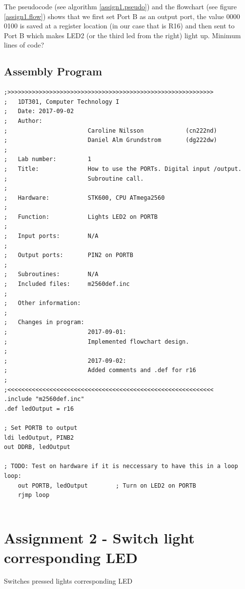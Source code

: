\documentclass[a4paper, 12pt]{article}
\begin{document}
The pseudocode (see algorithm \ref{assign1.pseudo}) and the flowchart (see figure \ref{assign1.flow}) shows that we first set Port B as an output port, the value 0000 0100 is saved at a register location (in our case that is R16) and then sent to Port B which makes LED2 (or the third led from the right) light up. 
Minimum lines of code?
\newpage
\subsection{Assembly Program}
\begin{lstlisting}[basicstyle=\tiny]
;>>>>>>>>>>>>>>>>>>>>>>>>>>>>>>>>>>>>>>>>>>>>>>>>>>>>>>>>>>>
;   1DT301, Computer Technology I
;   Date: 2017-09-02
;   Author:
;                       Caroline Nilsson            (cn222nd)
;                       Daniel Alm Grundstrom       (dg222dw)
;
;   Lab number:         1
;   Title:              How to use the PORTs. Digital input /output.
;                       Subroutine call.
;
;   Hardware:           STK600, CPU ATmega2560
;
;   Function:           Lights LED2 on PORTB
;
;   Input ports:        N/A
;
;   Output ports:       PIN2 on PORTB
;
;   Subroutines:        N/A
;   Included files:     m2560def.inc
;
;   Other information:
;
;   Changes in program: 
;                       2017-09-01:
;                       Implemented flowchart design.
;
;                       2017-09-02:
;                       Added comments and .def for r16
;
;<<<<<<<<<<<<<<<<<<<<<<<<<<<<<<<<<<<<<<<<<<<<<<<<<<<<<<<<<<<
.include "m2560def.inc"
.def ledOutput = r16

; Set PORTB to output
ldi ledOutput, PINB2
out DDRB, ledOutput

; TODO: Test on hardware if it is neccessary to have this in a loop
loop:
    out PORTB, ledOutput        ; Turn on LED2 on PORTB
    rjmp loop


\end{lstlisting}

\newpage

\section{Assignment 2 - Switch light corresponding LED}
\begin{algorithm}
\begin{algorithmic}
\Repeat
{} 
\Until{$\infty$}
\EndProcedure
\caption{Switches pressed lights corresponding LED}
\label{assign2.pseudo}
\end{algorithmic}
\end{algorithm}
\end{document}
